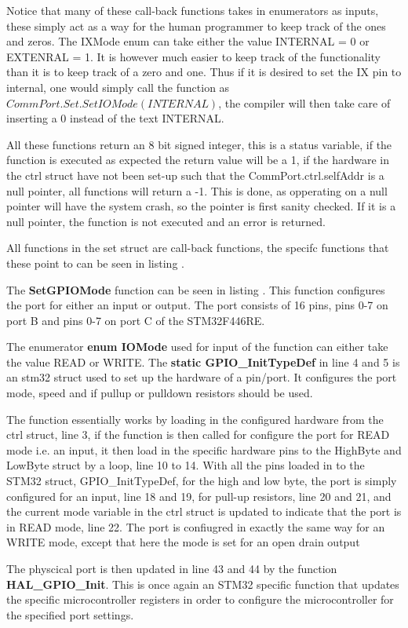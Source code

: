 Notice that many of these call-back functions takes in enumerators as inputs, these simply act as a way for the human programmer to keep track of the ones and zeros. The IXMode enum can take either the value INTERNAL = 0 or EXTENRAL = 1. It is however much easier to keep track of the functionality than it is to keep track of a zero and one. Thus if it is desired to set the IX pin to internal, one would simply call the function as $CommPort.Set.SetIOMode(INTERNAL)$, the compiler will then take care of inserting a 0 instead of the text INTERNAL. 

All these functions return an 8 bit signed integer, this is a status variable, if the function is executed as expected the return value will be a 1, if the hardware in the ctrl struct have not been set-up such that the CommPort.ctrl.selfAddr is a null pointer, all functions will return a -1. This is done, as opperating on a null pointer will have the system crash, so the pointer is first sanity checked. If it is a null pointer, the function is not executed and an error is returned.

All functions in the set struct are call-back functions, the specifc functions that these point to can be seen in listing .


The \textbf{SetGPIOMode} function can be seen in listing . This function configures the port for either an input or output. The port consists of 16 pins, pins 0-7 on port B and pins 0-7 on port C of the STM32F446RE.


The enumerator \textbf{enum IOMode} used for input of the function can either take the value READ or WRITE. The \textbf{static GPIO\_InitTypeDef} in line 4 and 5 is an stm32 struct used to set up the hardware of a pin/port. It configures the port mode, speed and if pullup or pulldown resistors should be used.

The function essentially works by loading in the configured hardware from the ctrl struct, line 3, if the function is then called for configure the port for READ mode i.e. an input, it then load in the specific hardware pins to the HighByte and LowByte struct by a loop, line 10 to 14. With all the pins loaded in to the STM32 struct, GPIO\_InitTypeDef, for the high and low byte, the port is simply configured for an input, line 18 and 19, for pull-up resistors, line 20 and 21, and the current mode variable in the ctrl struct is updated to indicate that the port is in READ mode, line 22. The port is confiugred in exactly the same way for an WRITE mode, except that here the mode is set for an open drain output

The physcical port is then updated in line 43 and 44 by the function \textbf{HAL\_GPIO\_Init}. This is once again an STM32 specific function that updates the specific microcontroller registers in order to configure the microcontroller for the specified port settings.

